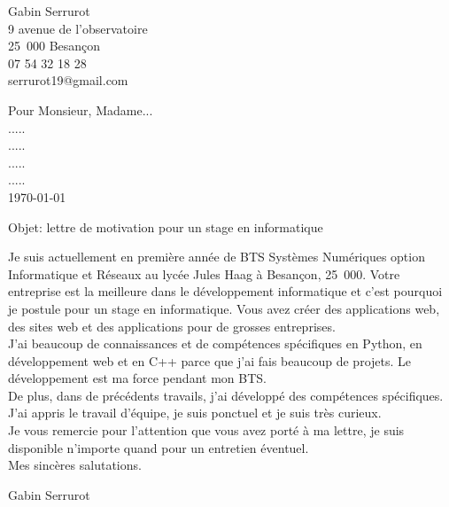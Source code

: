 \documentclass[11pt,a4paper,openany]{book}
\begin{document}
\thispagestyle{empty}

\begin{flushleft}
Gabin Serrurot\\
9 avenue de l'observatoire\\
25~000 Besançon\\
07 54 32 18 28\\
serrurot19@gmail.com\newline
\end{flushleft}

\medskip

\begin{flushright}
Pour Monsieur, Madame...\\
.....\\
.....\\
.....\\
.....\\
\today\\
\end{flushright}

\medskip

\begin{flushleft}
Objet: lettre de motivation pour un stage en informatique \newline
\end{flushleft}

Je suis actuellement en première année de BTS Systèmes Numériques option Informatique et Réseaux au lycée Jules Haag à Besançon, 25~000. Votre entreprise est la meilleure dans le développement informatique et c'est pourquoi je postule pour un stage en informatique. \newline
Vous avez créer des applications web, des sites web et des applications pour de grosses entreprises.\\
J'ai beaucoup de connaissances et de compétences spécifiques en Python, en développement web et en C++ parce que j'ai fais beaucoup de projets. Le développement est ma force pendant mon BTS.\\
De plus, dans de précédents travails, j'ai développé des compétences spécifiques. J'ai appris le travail d'équipe, je suis ponctuel et je suis très curieux.\\

Je vous remercie pour l'attention que vous avez porté à ma lettre, je suis disponible n'importe quand pour un entretien éventuel.\\

Mes sincères salutations.\\

\begin{flushright}
Gabin Serrurot
\end{flushright}
\end{document}
